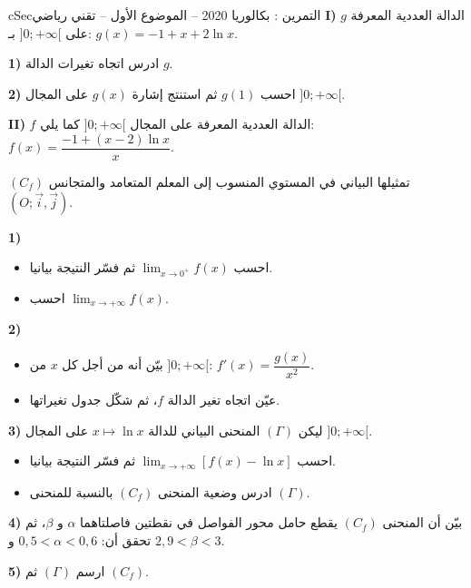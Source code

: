 \documentclass[12pt,a4paper]{article}
\newenvironment{BOX}[2]{\begin{otherlanguage}{english}\begin{arbox}{#1}{#2}}{\end{arbox}\end{otherlanguage}}
\newcounter{exo}
\newenvironment{tamrin}[1]{\stepcounter{exo}\begin{BOX}{cSec}{التمرين \theexo: #1}}{\end{BOX}}
\newenvironment{sq}{\begin{itemize}[leftmargin=2.4em,itemsep=3pt]}{\end{itemize}}
\newcommand{\qa}{\item[(أ)]}\newcommand{\qb}{\item[(ب)]}\newcommand{\qc}{\item[(جـ)]}\newcommand{\qd}{\item[(د)]}\newcommand{\qe}{\item[(هـ)]}
\begin{document}
\begin{tamrin}{بكالوريا 2020 -- الموضوع الأول -- تقني رياضي}
\textbf{I)} $g$ الدالة العددية المعرفة على $]0;+\infty[$ بـ: $g(x)=-1+x+2\ln x$.

\textbf{1)} ادرس اتجاه تغيرات الدالة $g$.

\textbf{2)} احسب $g(1)$ ثم استنتج إشارة $g(x)$ على المجال $]0;+\infty[$.

\textbf{II)} $f$ الدالة العددية المعرفة على المجال $]0;+\infty[$ كما يلي: $f(x)=\dfrac{-1+(x-2)\ln x}{x}$.

$(C_f)$ تمثيلها البياني في المستوي المنسوب إلى المعلم المتعامد والمتجانس $(O;\vec i,\vec j)$.

\textbf{1)}
\begin{sq}
\qa احسب $\displaystyle\lim_{x\to0^+}f(x)$ ثم فسّر النتيجة بيانيا.
\qb احسب $\displaystyle\lim_{x\to+\infty}f(x)$.
\end{sq}
\textbf{2)}
\begin{sq}
\qa بيّن أنه من أجل كل $x$ من $]0;+\infty[$: $f'(x)=\dfrac{g(x)}{x^2}$.
\qb عيّن اتجاه تغير الدالة $f$، ثم شكّل جدول تغيراتها.
\end{sq}
\textbf{3)} ليكن $(\Gamma)$ المنحنى البياني للدالة $x\mapsto\ln x$ على المجال $]0;+\infty[$.
\begin{sq}
\qa احسب $\displaystyle\lim_{x\to+\infty}\left[f(x)-\ln x\right]$ ثم فسّر النتيجة بيانيا.
\qb ادرس وضعية المنحنى $(C_f)$ بالنسبة للمنحنى $(\Gamma)$.
\end{sq}
\textbf{4)} بيّن أن المنحنى $(C_f)$ يقطع حامل محور الفواصل في نقطتين فاصلتاهما $\alpha$ و $\beta$، ثم تحقق أن: $0{,}5<\alpha<0{,}6$ و $2{,}9<\beta<3$.

\textbf{5)} ارسم $(\Gamma)$ ثم $(C_f)$.
\end{tamrin}
\end{document}
